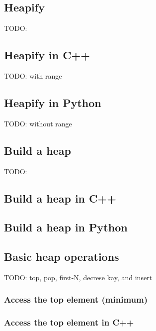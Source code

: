 \documentclass{article}
\begin{document}
\subsection{Heapify}

TODO:

\subsection*{Heapify in C++}

TODO: with range

\subsection*{Heapify in Python}

TODO: without range

\subsection{Build a heap}

TODO:

\subsection*{Build a heap in C++}

\subsection*{Build a heap in Python}

\subsection{Basic heap operations}

TODO: top, pop, first-N, decrese kay, and insert

\subsubsection{Access the top element (minimum)}

\subsubsection*{Access the top element in C++}
\end{document}
